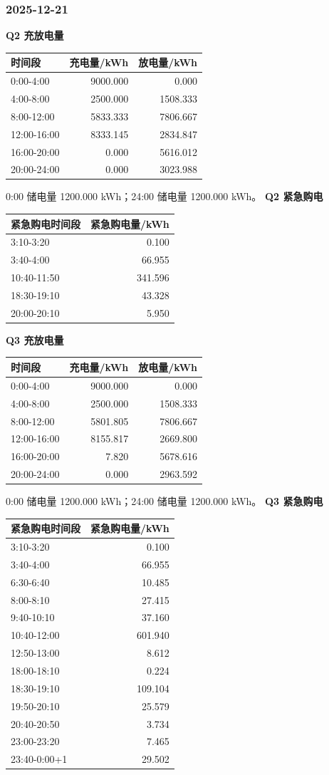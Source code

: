 \subsubsection{2025-12-21}
\textbf{Q2 充放电量}
\begin{longtable}[]{@{}lrr@{}}\toprule 时间段 & 充电量/kWh & 放电量/kWh \\\midrule\endhead
0:00-4:00 & 9000.000 & 0.000 \\
4:00-8:00 & 2500.000 & 1508.333 \\
8:00-12:00 & 5833.333 & 7806.667 \\
12:00-16:00 & 8333.145 & 2834.847 \\
16:00-20:00 & 0.000 & 5616.012 \\
20:00-24:00 & 0.000 & 3023.988 \\
\bottomrule\end{longtable}
0:00 储电量 1200.000 kWh；24:00 储电量 1200.000 kWh。
\textbf{Q2 紧急购电}
\begin{longtable}[]{@{}lr@{}}\toprule 紧急购电时间段 & 紧急购电量/kWh \\\midrule\endhead
3:10-3:20 & 0.100 \\
3:40-4:00 & 66.955 \\
10:40-11:50 & 341.596 \\
18:30-19:10 & 43.328 \\
20:00-20:10 & 5.950 \\
\bottomrule\end{longtable}
\textbf{Q3 充放电量}
\begin{longtable}[]{@{}lrr@{}}\toprule 时间段 & 充电量/kWh & 放电量/kWh \\\midrule\endhead
0:00-4:00 & 9000.000 & 0.000 \\
4:00-8:00 & 2500.000 & 1508.333 \\
8:00-12:00 & 5801.805 & 7806.667 \\
12:00-16:00 & 8155.817 & 2669.800 \\
16:00-20:00 & 7.820 & 5678.616 \\
20:00-24:00 & 0.000 & 2963.592 \\
\bottomrule\end{longtable}
0:00 储电量 1200.000 kWh；24:00 储电量 1200.000 kWh。
\textbf{Q3 紧急购电}
\begin{longtable}[]{@{}lr@{}}\toprule 紧急购电时间段 & 紧急购电量/kWh \\\midrule\endhead
3:10-3:20 & 0.100 \\
3:40-4:00 & 66.955 \\
6:30-6:40 & 10.485 \\
8:00-8:10 & 27.415 \\
9:40-10:10 & 37.160 \\
10:40-12:00 & 601.940 \\
12:50-13:00 & 8.612 \\
18:00-18:10 & 0.224 \\
18:30-19:10 & 109.104 \\
19:50-20:10 & 25.579 \\
20:40-20:50 & 3.734 \\
23:00-23:20 & 7.465 \\
23:40-0:00+1 & 29.502 \\
\bottomrule\end{longtable}

